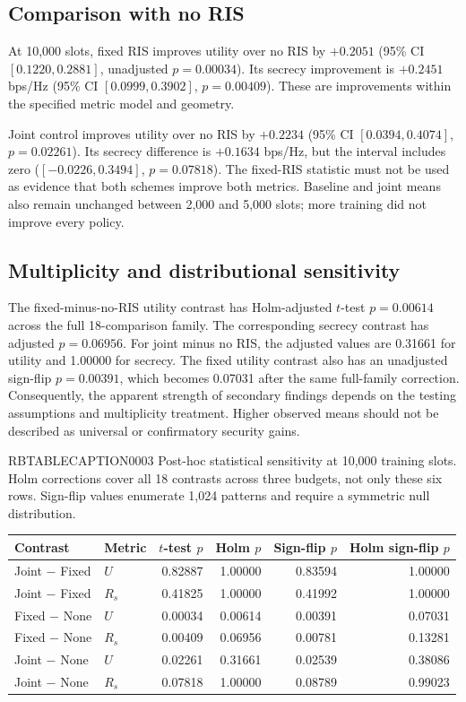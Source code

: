 \documentclass[journal,10pt,twocolumn]{IEEEtran}
\begin{document}
\subsection{Comparison with no RIS}
At 10,000 slots, fixed RIS improves utility over no RIS by $+0.2051$ (95\% CI $[0.1220,0.2881]$, unadjusted $p=0.00034$). Its secrecy improvement is $+0.2451$ bps/Hz (95\% CI $[0.0999,0.3902]$, $p=0.00409$). These are improvements within the specified metric model and geometry.

Joint control improves utility over no RIS by $+0.2234$ (95\% CI $[0.0394,0.4074]$, $p=0.02261$). Its secrecy difference is $+0.1634$ bps/Hz, but the interval includes zero ($[-0.0226,0.3494]$, $p=0.07818$). The fixed-RIS statistic must not be used as evidence that both schemes improve both metrics. Baseline and joint means also remain unchanged between 2,000 and 5,000 slots; more training did not improve every policy.

\subsection{Multiplicity and distributional sensitivity}
The fixed-minus-no-RIS utility contrast has Holm-adjusted $t$-test $p=0.00614$ across the full 18-comparison family. The corresponding secrecy contrast has adjusted $p=0.06956$. For joint minus no RIS, the adjusted values are 0.31661 for utility and 1.00000 for secrecy. The fixed utility contrast also has an unadjusted sign-flip $p=0.00391$, which becomes 0.07031 after the same full-family correction. Consequently, the apparent strength of secondary findings depends on the testing assumptions and multiplicity treatment. Higher observed means should not be described as universal or confirmatory security gains.


RBTABLECAPTION0003 Post-hoc statistical sensitivity at 10,000 training slots. Holm corrections cover all 18 contrasts across three budgets, not only these six rows. Sign-flip values enumerate 1,024 patterns and require a symmetric null distribution.

\begin{table}[t]
\centering


\begin{tabular}{llrrrr}
\toprule
Contrast & Metric & $t$-test $p$ & Holm $p$ & Sign-flip $p$ & Holm sign-flip $p$\\
\midrule
Joint $-$ Fixed & $U$ & 0.82887 & 1.00000 & 0.83594 & 1.00000 \\
Joint $-$ Fixed & $R_s$ & 0.41825 & 1.00000 & 0.41992 & 1.00000 \\
Fixed $-$ None & $U$ & 0.00034 & 0.00614 & 0.00391 & 0.07031 \\
Fixed $-$ None & $R_s$ & 0.00409 & 0.06956 & 0.00781 & 0.13281 \\
Joint $-$ None & $U$ & 0.02261 & 0.31661 & 0.02539 & 0.38086 \\
Joint $-$ None & $R_s$ & 0.07818 & 1.00000 & 0.08789 & 0.99023 \\
\bottomrule
\end{tabular}
\end{table}
\end{document}

